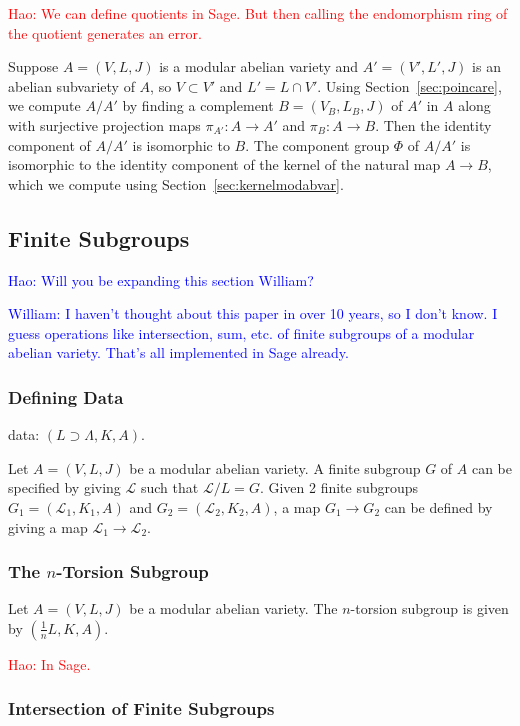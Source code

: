\documentclass{article}
\newcommand{\Hao}[1]{\textcolor{blue}{\textsf{Hao: #1}}}
\newcommand{\wstein}[1]{\textcolor{blue}{\textsf{William: #1}}}
\newcommand{\Haonew}[1]{\textcolor{red}{\textsf{Hao: #1}}}
\begin{document}
\Haonew{We can define quotients in Sage. But then calling the endomorphism ring of the quotient generates an error.}

Suppose $A = (V, L, J)$ is a modular abelian variety and $A' = (V',
L', J)$ is an abelian subvariety of $A$, so $V\subset V'$ and $L' =
L\cap V'$.  Using Section~\ref{sec:poincare}, we compute $A/A'$ by
finding a complement $B=(V_B,L_B,J)$ of $A'$ in $A$ along with
surjective projection maps $\pi_{A'}: A \to A'$ and $\pi_B: A\to B$.
Then the identity component of $A/A'$ is isomorphic to $B$.  The
component group $\Phi$ of $A/A'$ is isomorphic to the identity
component of the kernel of the natural map $A \to B$, which we compute
using Section~\ref{sec:kernelmodabvar}.

\subsection{Finite Subgroups}

\Hao{Will you be expanding this section William?}

\wstein{I haven't thought about this paper in over 10 years,
so I don't know.  I guess operations like intersection, sum, etc.
of finite subgroups of a modular abelian variety. That's all implemented
in Sage already.}

\subsubsection{Defining Data}


data: $(L\supset \Lambda, K, A)$.

Let $A=(V, L, J)$ be a modular abelian variety. A finite subgroup $G$ of $A$ can be
specified by giving $\mathcal{L}$ such that $\mathcal{L}/L = G$. Given 2 finite
subgroups $G_1=(\mathcal{L}_1, K_1, A)$ and $G_2=(\mathcal{L}_2, K_2, A)$, a
map $G_1\to G_2$ can be defined by giving a map $\mathcal{L}_1\to
\mathcal{L}_2$.


\subsubsection{The $n$-Torsion Subgroup}

Let $A=(V, L, J)$ be a modular abelian variety. The $n$-torsion subgroup is
given by $(\frac{1}{n} L, K, A)$.

\Haonew{In Sage.}


\subsubsection{Intersection of Finite Subgroups}
\end{document}

